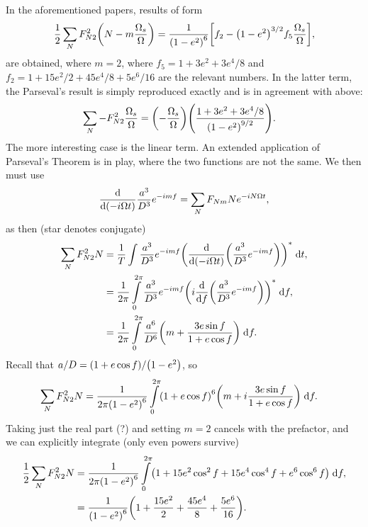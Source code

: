 \documentclass[11pt,
        usenames, %
        dvipsnames %
    ]{article}
\newcommand*{\rd}[2]{\frac{\mathrm{d}#1}{\mathrm{d}#2}}
\DeclarePairedDelimiter\p{\lparen}{\rparen}
\DeclarePairedDelimiter\s{\lbrack}{\rbrack}
\begin{document}
In the aforementioned papers, results of form
\begin{equation}
    \frac{1}{2}\sum\limits_{N}F_{N2}^2 \p*{N - m\frac{\Omega_s}{\Omega}}
        = \frac{1}{\p*{1 - e^2}^6}\s*{f_2 - \p*{1 - e^2}^{3/2}
            f_5\frac{\Omega_s}{\Omega}},
\end{equation}
are obtained, where $m = 2$, where $f_5 = 1 + 3e^2 + 3e^4/8$ and $f_2 = 1 +
15e^2/2 + 45e^4/8 + 5e^6/16$ are the relevant numbers. In the latter term, the
Parseval's result is simply reproduced exactly and is in agreement with above:
\begin{align}
    \sum\limits_N -F_{N2}^2\frac{\Omega_s}{\Omega}
        &= \p*{-\frac{\Omega_s}{\Omega}}\p*{\frac{1 + 3e^2 + 3e^4/8}{
            \p*{1 - e^2}^{9/2}}}.
\end{align}
The more interesting case is the linear term. An extended application of
Parseval's Theorem is in play, where the two functions are not the same. We then
must use
\begin{equation}
    \rd{}{\p*{-i \Omega t}}\frac{a^3}{D^3}e^{-imf}
        = \sum\limits_N F_{Nm} Ne^{-iN\Omega t},
\end{equation}
as then (star denotes conjugate)
\begin{align}
    \sum\limits_N F_{N2}^2 N &= \frac{1}{T}\int\limits
        \frac{a^3}{D^3}e^{-imf}
            \p*{\rd{}{\p*{-i \Omega t}}\p*{\frac{a^3}{D^3}
                e^{-imf}}}^*\;\mathrm{d}t,\\
        &= \frac{1}{2\pi} \int\limits_0^{2\pi}
            \frac{a^3}{D^3}e^{-imf}
            \p*{i\rd{}{f}\p*{\frac{a^3}{D^3}
                e^{-imf}}}^*\;\mathrm{d}f,\\
        &= \frac{1}{2\pi} \int\limits_0^{2\pi}
            \frac{a^6}{D^6}\p*{m + \frac{3e\sin f}{1 + e\cos f}}
                \;\mathrm{d}f.
\end{align}
Recall that $a/D = \p*{1 + e\cos f} / \p*{1 - e^2}$, so
\begin{align}
    \sum\limits_N F_{N2}^2 N
        &= \frac{1}{2\pi\p*{1 - e^2}^6} \int\limits_0^{2\pi}
            \p*{1 + e\cos f}^6\p*{m + i\frac{3e\sin f}{1 + e\cos f}}
                \;\mathrm{d}f.
\end{align}
Taking just the real part (?) and setting $m = 2$ cancels with the prefactor,
and we can explicitly integrate (only even powers survive)
\begin{align}
    \frac{1}{2}\sum\limits_N F_{N2}^2N
        &= \frac{1}{2\pi\p*{1 - e^2}^6}\int\limits_0^{2\pi}
            \p*{1 + 15e^2\cos^2f + 15e^4\cos^4f
                + e^6\cos^6 f}\;\mathrm{d}f,\\
        &= \frac{1}{\p*{1 - e^2}^6}\p*{1 + \frac{15e^2}{2}
            + \frac{45 e^4}{8} + \frac{5e^6}{16}}.
\end{align}
\end{document}

